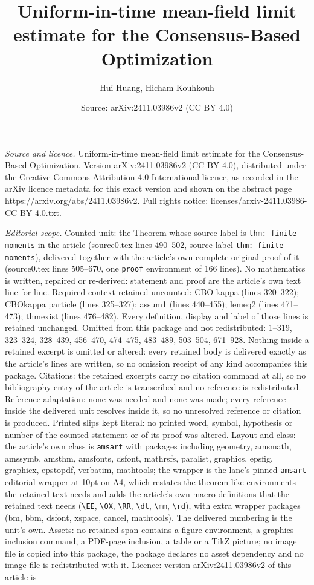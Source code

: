 \documentclass[10pt,a4paper]{amsart}
\title[Uniform-in-time mean-field limit estimate for the Consensus-]{Uniform-in-time mean-field limit estimate for the Consensus-Based Optimization}
\author{Hui Huang, Hicham Kouhkouh}
\date{Source: arXiv:2411.03986v2 (CC BY 4.0)}
\begin{document}
\maketitle

\noindent\emph{Source and licence.} Uniform-in-time mean-field limit estimate for the Consensus-Based Optimization. Version arXiv:2411.03986v2 (CC BY 4.0), distributed under the Creative Commons Attribution 4.0 International licence, as recorded in the arXiv licence metadata for this exact version and shown on the abstract page https://arxiv.org/abs/2411.03986v2. Full rights notice: licenses/arxiv-2411.03986-CC-BY-4.0.txt.\par\smallskip

\noindent\textit{Editorial scope.} Counted unit: the Theorem whose source label is \texttt{thm: finite moments} in the article (source0.tex lines 490--502, source label \texttt{thm: finite moments}), delivered together with the article's own complete original proof of it (source0.tex lines 505--670, one \texttt{proof} environment of 166 lines). No mathematics is written, repaired or re-derived: statement and proof are the article's own text line for line. Required context retained uncounted: CBO kappa (lines 320--322); CBOkappa particle (lines 325--327); assum1 (lines 440--455); lemeq2 (lines 471--473); thmexist (lines 476--482). Every definition, display and label of those lines is retained unchanged. Omitted from this package and not redistributed: 1--319, 323--324, 328--439, 456--470, 474--475, 483--489, 503--504, 671--928. Nothing inside a retained excerpt is omitted or altered: every retained body is delivered exactly as the article's lines are written, so no omission receipt of any kind accompanies this package. Citations: the retained excerpts carry no citation command at all, so no bibliography entry of the article is transcribed and no reference is redistributed. Reference adaptation: none was needed and none was made; every reference inside the delivered unit resolves inside it, so no unresolved reference or citation is produced. Printed slips kept literal: no printed word, symbol, hypothesis or number of the counted statement or of its proof was altered. Layout and class: the article's own class is \texttt{amsart} with packages including geometry, amsmath, amssymb, amsthm, amsfonts, dsfont, mathrsfs, paralist, graphics, epsfig, graphicx, epstopdf, verbatim, mathtools; the wrapper is the lane's pinned \texttt{amsart} editorial wrapper at 10pt on A4, which restates the theorem-like environments the retained text needs and adds the article's own macro definitions that the retained text needs (\texttt{\textbackslash EE}, \texttt{\textbackslash OX}, \texttt{\textbackslash RR}, \texttt{\textbackslash dt}, \texttt{\textbackslash mm}, \texttt{\textbackslash rd}), with extra wrapper packages (bm, bbm, dsfont, xspace, cancel, mathtools). The delivered numbering is the unit's own. Assets: no retained span contains a figure environment, a graphics-inclusion command, a PDF-page inclusion, a table or a TikZ picture; no image file is copied into this package, the package declares no asset dependency and no image file is redistributed with it. Licence: version arXiv:2411.03986v2 of this article is 
\end{document}
